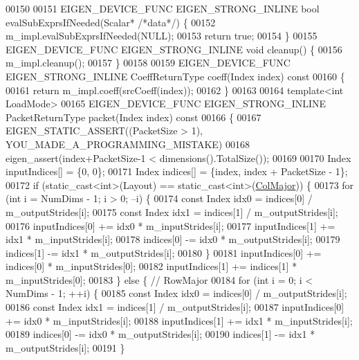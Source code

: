 \begin{DoxyCode}
00150 
00151   EIGEN\_DEVICE\_FUNC EIGEN\_STRONG\_INLINE \textcolor{keywordtype}{bool} evalSubExprsIfNeeded(Scalar* \textcolor{comment}{/*data*/}) \{
00152     m\_impl.evalSubExprsIfNeeded(NULL);
00153     \textcolor{keywordflow}{return} \textcolor{keyword}{true};
00154   \}
00155   EIGEN\_DEVICE\_FUNC EIGEN\_STRONG\_INLINE \textcolor{keywordtype}{void} cleanup() \{
00156     m\_impl.cleanup();
00157   \}
00158 
00159   EIGEN\_DEVICE\_FUNC EIGEN\_STRONG\_INLINE CoeffReturnType coeff(Index index)\textcolor{keyword}{ const}
00160 \textcolor{keyword}{  }\{
00161     \textcolor{keywordflow}{return} m\_impl.coeff(srcCoeff(index));
00162   \}
00163 
00164   \textcolor{keyword}{template}<\textcolor{keywordtype}{int} LoadMode>
00165   EIGEN\_DEVICE\_FUNC EIGEN\_STRONG\_INLINE PacketReturnType packet(Index index)\textcolor{keyword}{ const}
00166 \textcolor{keyword}{  }\{
00167     EIGEN\_STATIC\_ASSERT((PacketSize > 1), YOU\_MADE\_A\_PROGRAMMING\_MISTAKE)
00168     eigen\_assert(index+PacketSize-1 < dimensions().TotalSize());
00169 
00170     Index inputIndices[] = \{0, 0\};
00171     Index indices[] = \{index, index + PacketSize - 1\};
00172     \textcolor{keywordflow}{if} (static\_cast<int>(Layout) == static\_cast<int>(\hyperlink{group__enums_ggaacded1a18ae58b0f554751f6cdf9eb13a0cbd4bdd0abcfc0224c5fcb5e4f6669a}{ColMajor})) \{
00173       \textcolor{keywordflow}{for} (\textcolor{keywordtype}{int} i = NumDims - 1; i > 0; --i) \{
00174         \textcolor{keyword}{const} Index idx0 = indices[0] / m\_outputStrides[i];
00175         \textcolor{keyword}{const} Index idx1 = indices[1] / m\_outputStrides[i];
00176         inputIndices[0] += idx0 * m\_inputStrides[i];
00177         inputIndices[1] += idx1 * m\_inputStrides[i];
00178         indices[0] -= idx0 * m\_outputStrides[i];
00179         indices[1] -= idx1 * m\_outputStrides[i];
00180       \}
00181       inputIndices[0] += indices[0] * m\_inputStrides[0];
00182       inputIndices[1] += indices[1] * m\_inputStrides[0];
00183     \} \textcolor{keywordflow}{else} \{  \textcolor{comment}{// RowMajor}
00184       \textcolor{keywordflow}{for} (\textcolor{keywordtype}{int} i = 0; i < NumDims - 1; ++i) \{
00185         \textcolor{keyword}{const} Index idx0 = indices[0] / m\_outputStrides[i];
00186         \textcolor{keyword}{const} Index idx1 = indices[1] / m\_outputStrides[i];
00187         inputIndices[0] += idx0 * m\_inputStrides[i];
00188         inputIndices[1] += idx1 * m\_inputStrides[i];
00189         indices[0] -= idx0 * m\_outputStrides[i];
00190         indices[1] -= idx1 * m\_outputStrides[i];
00191       \}

\end{DoxyCode}
